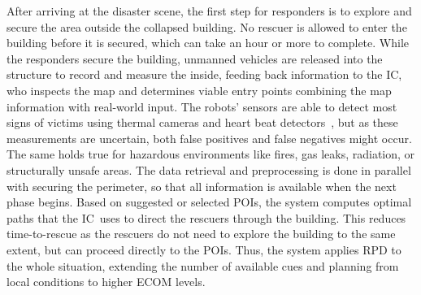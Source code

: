 \documentclass[conference,10pt,letter]{IEEEtran}
\def\IC{IC}
\begin{document}
%
%
After arriving at the disaster scene, the first step for responders is to explore and secure the area outside the collapsed building. No rescuer is allowed to enter the building before it is secured, which can take an hour or more to complete. While the responders secure the building, unmanned vehicles are released into the structure to record and measure the inside, feeding back information to the \IC , who inspects the map and determines viable entry points combining the map information with real-world input. The robots' sensors are able to detect most signs of victims using thermal cameras and heart beat detectors~\cite{Wu12Eulerian}, but as these measurements are uncertain, both false positives and false negatives might occur. The same holds true for hazardous environments like fires, gas leaks, radiation, or structurally unsafe areas. The data retrieval and preprocessing is done in parallel with securing the perimeter, so that all information is available when the next phase begins. Based on suggested or selected POIs, the system computes optimal paths that the \IC\ uses to direct the rescuers through the building. This reduces time-to-rescue as the rescuers do not need to explore the building to the same extent, but can proceed directly to the POIs. Thus, the system applies RPD to the whole situation, extending the number of available cues and planning from local conditions to higher ECOM levels.
\end{document}
